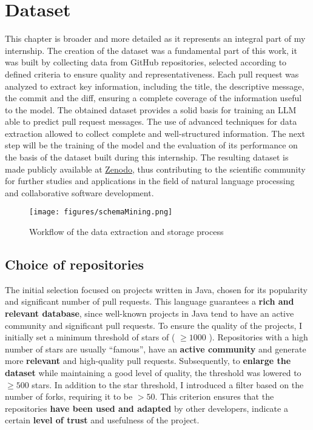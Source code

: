\section{Dataset}
This chapter is broader and more detailed as it represents an integral part of my internship.
The creation of the dataset was a fundamental part of this work, it was built by collecting data from GitHub repositories, selected according to defined criteria to ensure quality and representativeness. Each pull request was analyzed to extract key information, including the title, the descriptive message, the commit and the diff, ensuring a complete coverage of the information useful to the model. The obtained dataset provides a solid basis for training an LLM able to predict pull request messages. The use of advanced techniques for data extraction allowed to collect complete and well-structured information. The next step will be the training of the model and the evaluation of its performance on the basis of the dataset built during this internship.
The resulting dataset is made publicly available at \href{https://zenodo.org/records/14546914?token=eyJhbGciOiJIUzUxMiJ9.eyJpZCI6IjBhODI4NDk5LTdlODItNDZhZS1iZDgwLWEwNDUwMWQyOTg3YSIsImRhdGEiOnt9LCJyYW5kb20iOiIzZTFjYTBmMjkxMGRkNmVkYTY5M2Y2ZDFlODAyYTdmYyJ9.IiQkMkHUAq2AzlhwHkaLyXBMDycStf--_gtWm1ZCQadw9IFWeaJakTNiXLE4PNPnm-cPYi63f1vPUfEy-lyo_Q}{Zenodo}, thus contributing to the scientific community for further studies and applications in the field of natural language processing and collaborative software development.
\begin{figure}[H] 
    \centering
        \texttt{[image: figures/schemaMining.png]}
        \caption{Workflow of the data extraction and storage process}       

\end{figure}
\subsection{Choice of repositories}
The initial selection focused on projects written in Java, chosen for its popularity and significant number of pull requests. This language guarantees a \textbf{rich and relevant database}, since well-known projects in Java tend to have an active community and significant pull requests.
To ensure the quality of the projects, I initially set a minimum threshold of stars of ( $\geq 1000$ ). Repositories with a high number of stars are usually ``famous'', have an \textbf{active community} and generate more \textbf{relevant} and high-quality pull requests.
Subsequently, to \textbf{enlarge the dataset} while maintaining a good level of quality, the threshold was lowered to \( \geq 500 \) stars.
In addition to the star threshold, I introduced a filter based on the number of forks, requiring it to be $> 50$. This criterion ensures that the repositories \textbf{have been used and adapted} by other developers, indicate a certain \textbf{level of trust} and usefulness of the project.

